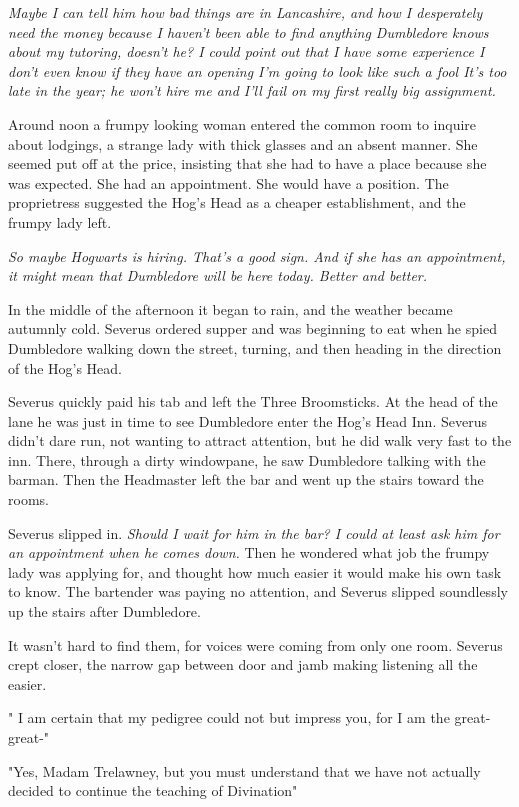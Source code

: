 \emph{Maybe I can tell him how bad things are in Lancashire, and how I desperately need the money because I haven't been able to find anything{\el} Dumbledore knows about my tutoring, doesn't he? I could point out that I have some experience{\el} I don't even know if they have an opening{\el} I'm going to look like such a fool{\el} It's too late in the year; he won't hire me and I'll fail on my first really big assignment.}

Around noon a frumpy looking woman entered the common room to inquire about lodgings, a strange lady with thick glasses and an absent manner. She seemed put off at the price, insisting that she had to have a place because she was expected. She had an appointment. She would have a position. The proprietress suggested the Hog's Head as a cheaper establishment, and the frumpy lady left.

\emph{So maybe Hogwarts is hiring. That's a good sign. And if she has an appointment, it might mean that Dumbledore will be here today. Better and better.}

In the middle of the afternoon it began to rain, and the weather became autumnly cold. Severus ordered supper and was beginning to eat when he spied Dumbledore walking down the street, turning, and then heading in the direction of the Hog's Head.

Severus quickly paid his tab and left the Three Broomsticks. At the head of the lane he was just in time to see Dumbledore enter the Hog's Head Inn. Severus didn't dare run, not wanting to attract attention, but he did walk very fast to the inn. There, through a dirty windowpane, he saw Dumbledore talking with the barman. Then the Headmaster left the bar and went up the stairs toward the rooms.

Severus slipped in. \emph{Should I wait for him in the bar? I could at least ask him for an appointment when he comes down.} Then he wondered what job the frumpy lady was applying for, and thought how much easier it would make his own task to know. The bartender was paying no attention, and Severus slipped soundlessly up the stairs after Dumbledore.

It wasn't hard to find them, for voices were coming from only one room. Severus crept closer, the narrow gap between door and jamb making listening all the easier.

"{\el} I am certain that my pedigree could not but impress you, for I am the great-great-{\el}"

"Yes, Madam Trelawney, but you must understand that we have not actually decided to continue the teaching of Divination{\el}"

